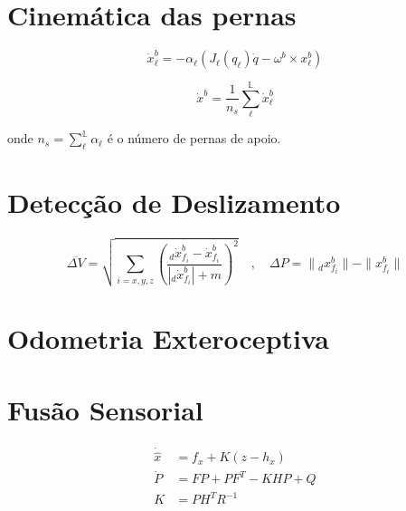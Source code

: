 \section{Cinemática das pernas}

\begin{equation}
    \dot{x}_{\ell}^{b} = -\alpha_{\ell} \left( J_{\ell}(q_{\ell})\dot{q} - \omega^{b} \times x_{\ell}^{b} \right)
\end{equation}

\begin{equation}
    \dot{x}^{b} = \frac{1}{n_s} \sum_{\ell}^{\mathbb{L}} \dot{x}_{\ell}^{b}
\end{equation}

onde $n_s = \sum_{\ell}^{\mathbb{L}} \alpha_{\ell}$ é o número de pernas de apoio.

\section{Detecção de Deslizamento}

\begin{equation}
    \overline{\Delta V} = \sqrt{\sum_{i=x,y,z} \left( \frac{{}_{d}\dot{x}_{f_i}^{b} - 
    \dot{x}_{f_i}^{b}}{|{}_{d}\dot{x}_{f_i}^{b}| + 
    m} \right)^2 } \quad , \quad \Delta P = \| {}_{d}x_{f_i}^{b} \| - \| x_{f_i}^{b} \|
\end{equation}

\section{Odometria Exteroceptiva}

\section{Fusão Sensorial}
\begin{subequations}
\begin{align}
    \dot{\hat{x}} &= f_x + K(z - h_x) \\
    \dot{P} &= FP + PF^{T} - KHP + Q \\
    K &= PH^{T}R^{-1}
\end{align}
\end{subequations}

